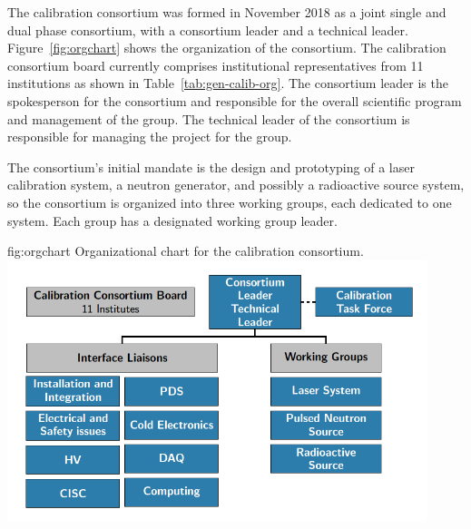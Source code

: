 
The calibration consortium was formed in November 2018 as a joint single and dual phase consortium, with a consortium leader and a technical leader. Figure~\ref{fig:orgchart} shows the organization of the consortium. The calibration consortium board currently comprises institutional representatives from 11 institutions as shown in Table~\ref{tab:gen-calib-org}. The consortium leader is the spokesperson for the consortium and responsible for the overall scientific program and management of the group. The technical leader of the consortium is responsible for managing the project for the group. 

The consortium's initial mandate is the design and prototyping of a laser calibration system, a neutron generator, and possibly a radioactive source system, so the consortium is organized into three working groups, each dedicated to one system. Each group has a designated working group leader.


\begin{dunefigure}{fig:orgchart}
{Organizational chart for the calibration consortium.}
\includegraphics[height=3.0in]{graphics/orgchart_calib_sp.png}
\end{dunefigure}


